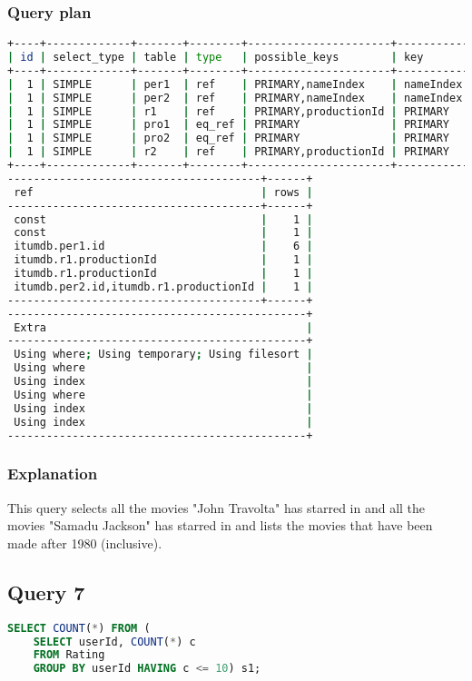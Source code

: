 \subsubsection{Query plan}
\begin{lstlisting}[language=bash]
+----+-------------+-------+--------+----------------------+-----------+---------+
| id | select_type | table | type   | possible_keys        | key       | key_len |
+----+-------------+-------+--------+----------------------+-----------+---------+
|  1 | SIMPLE      | per1  | ref    | PRIMARY,nameIndex    | nameIndex | 32      |
|  1 | SIMPLE      | per2  | ref    | PRIMARY,nameIndex    | nameIndex | 32      |
|  1 | SIMPLE      | r1    | ref    | PRIMARY,productionId | PRIMARY   | 4       |
|  1 | SIMPLE      | pro1  | eq_ref | PRIMARY              | PRIMARY   | 4       |
|  1 | SIMPLE      | pro2  | eq_ref | PRIMARY              | PRIMARY   | 4       |
|  1 | SIMPLE      | r2    | ref    | PRIMARY,productionId | PRIMARY   | 8       |
+----+-------------+-------+--------+----------------------+-----------+---------+
---------------------------------------+------+
 ref                                   | rows |
---------------------------------------+------+
 const                                 |    1 |
 const                                 |    1 |
 itumdb.per1.id                        |    6 |
 itumdb.r1.productionId                |    1 |
 itumdb.r1.productionId                |    1 |
 itumdb.per2.id,itumdb.r1.productionId |    1 |
---------------------------------------+------+
----------------------------------------------+
 Extra                                        |
----------------------------------------------+
 Using where; Using temporary; Using filesort |
 Using where                                  |
 Using index                                  |
 Using where                                  |
 Using index                                  |
 Using index                                  |
----------------------------------------------+
\end{lstlisting}

\subsubsection{Explanation}
This query selects all the movies "John Travolta" has starred in and all the movies "Samadu Jackson" has starred in and lists the movies that have been made after 1980 (inclusive).


\subsection{Query 7}
\begin{lstlisting}[language=sql]
SELECT COUNT(*) FROM (
	SELECT userId, COUNT(*) c
	FROM Rating
	GROUP BY userId HAVING c <= 10) s1;
\end{lstlisting}

